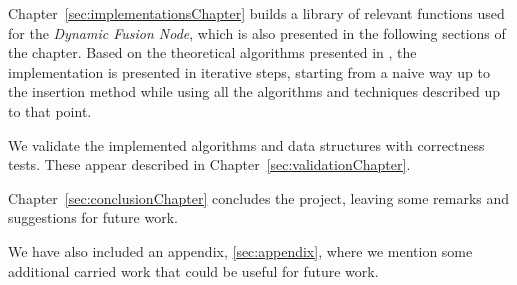 Chapter~\ref{sec:implementationsChapter} builds a library of relevant functions used for the \textit{Dynamic Fusion Node}, which is also presented in the following sections of the chapter.
Based on the theoretical algorithms presented in \cite{patrascu2014dynamic}, the implementation is presented in iterative steps, starting from a naive way up to the insertion method while using all the algorithms and techniques described up to that point.

We validate the implemented algorithms and data structures with correctness tests. These appear described in Chapter~\ref{sec:validationChapter}.

Chapter~\ref{sec:conclusionChapter} concludes the project, leaving some remarks and suggestions for future work.

We have also included an appendix, \ref{sec:appendix}, where we mention some additional carried work that could be useful for future work.